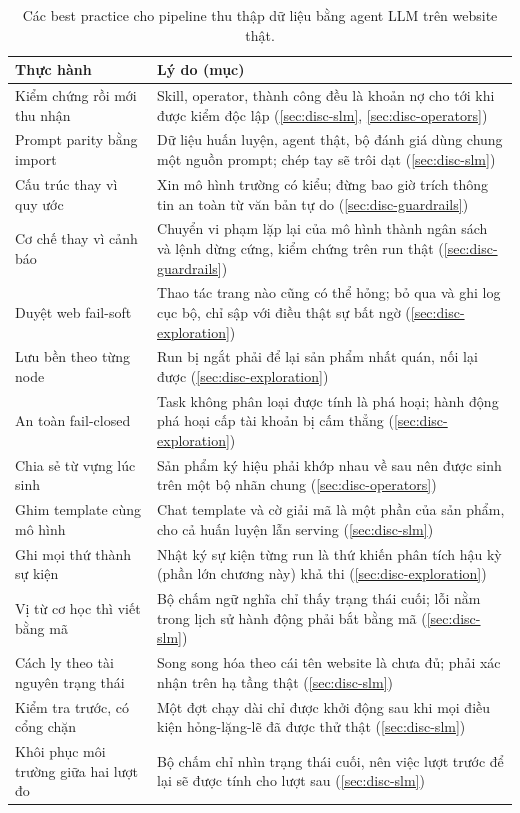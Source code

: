 \begin{table}[H]
\centering
\caption[Các best practice đã chưng cất]{Các best practice cho pipeline
thu thập dữ liệu bằng agent LLM trên website thật.}
\label{tab:app-practices}
\small
\begin{tabular}{@{}L{4.4cm} L{8.8cm}@{}}
\toprule
\textbf{Thực hành} & \textbf{Lý do (mục)} \\
\midrule
Kiểm chứng rồi mới thu nhận & Skill, operator, thành công đều là khoản nợ
cho tới khi được kiểm độc lập (\ref{sec:disc-slm}, \ref{sec:disc-operators}) \\
Prompt parity bằng import & Dữ liệu huấn luyện, agent thật, bộ đánh giá
dùng chung một nguồn prompt; chép tay sẽ trôi dạt (\ref{sec:disc-slm}) \\
Cấu trúc thay vì quy ước & Xin mô hình trường có kiểu; đừng bao giờ trích
thông tin an toàn từ văn bản tự do (\ref{sec:disc-guardrails}) \\
Cơ chế thay vì cảnh báo & Chuyển vi phạm lặp lại của mô hình thành ngân
sách và lệnh dừng cứng, kiểm chứng trên run thật (\ref{sec:disc-guardrails}) \\
Duyệt web fail-soft & Thao tác trang nào cũng có thể hỏng; bỏ qua và ghi
log cục bộ, chỉ sập với điều thật sự bất ngờ (\ref{sec:disc-exploration}) \\
Lưu bền theo từng node & Run bị ngắt phải để lại sản phẩm nhất quán, nối
lại được (\ref{sec:disc-exploration}) \\
An toàn fail-closed & Task không phân loại được tính là phá hoại; hành động
phá hoại cấp tài khoản bị cấm thẳng (\ref{sec:disc-exploration}) \\
Chia sẻ từ vựng lúc sinh & Sản phẩm ký hiệu phải khớp nhau về sau nên được
sinh trên một bộ nhãn chung (\ref{sec:disc-operators}) \\
Ghim template cùng mô hình & Chat template và cờ giải mã là một phần của
sản phẩm, cho cả huấn luyện lẫn serving (\ref{sec:disc-slm}) \\
Ghi mọi thứ thành sự kiện & Nhật ký sự kiện từng run là thứ khiến phân
tích hậu kỳ (phần lớn chương này) khả thi (\ref{sec:disc-exploration}) \\
Vị từ cơ học thì viết bằng mã & Bộ chấm ngữ nghĩa chỉ thấy trạng thái
cuối; lỗi nằm trong lịch sử hành động phải bắt bằng mã (\ref{sec:disc-slm}) \\
Cách ly theo tài nguyên trạng thái & Song song hóa theo cái tên website là
chưa đủ; phải xác nhận trên hạ tầng thật (\ref{sec:disc-slm}) \\
Kiểm tra trước, có cổng chặn & Một đợt chạy dài chỉ được khởi động sau khi
mọi điều kiện hỏng-lặng-lẽ đã được thử thật (\ref{sec:disc-slm}) \\
Khôi phục môi trường giữa hai lượt đo & Bộ chấm chỉ nhìn trạng thái cuối, nên
việc lượt trước để lại sẽ được tính cho lượt sau (\ref{sec:disc-slm}) \\
\bottomrule
\end{tabular}
\end{table}

